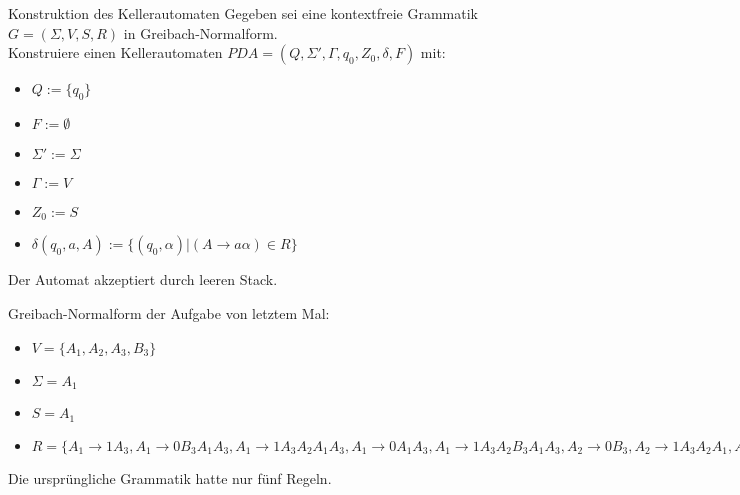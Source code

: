 \begin{frame}
 \begin{block}{Konstruktion des Kellerautomaten}
 Gegeben sei eine kontextfreie Grammatik \(G = (\Sigma, V, S, R)\) in Greibach-Normalform.\\
 Konstruiere einen Kellerautomaten \(PDA = (Q, \Sigma', \Gamma, q_0, Z_0, \delta, F)\) mit:
 \begin{itemize}
  \item $Q := \{q_0\}$
  \item $F := \emptyset$
  \item $\Sigma' := \Sigma$
  \item $\Gamma := V$
  \item $Z_0 := S$
  \item $\delta(q_0, a, A) :=  \{(q_0,\alpha) | (A \rightarrow a \alpha) \in R \}$
 \end{itemize}
 \end{block}
 \pause
 Der Automat akzeptiert durch leeren Stack.
\end{frame}

\begin{frame}
Greibach-Normalform der Aufgabe von letztem Mal:
\begin{itemize}
 \item $V=\{A_1, A_2, A_3, B_3\}$
 \item $\Sigma = A_1$
 \item $S = A_1$
 \item $R = \{A_1 \rightarrow 1A_3, A_1 \rightarrow 0B_3A_1A_3, A_1 \rightarrow 1A_3A_2A_1A_3, A_1 \rightarrow 0A_1A_3, A_1 \rightarrow 1A_3A_2B_3A_1A_3,
 A_2 \rightarrow 0B_3, A_2 \rightarrow 1A_3A_2A_1, A_2 \rightarrow 0A_1, A_2 \rightarrow 1A_3A_2B_3A_1, A_2 \rightarrow 1,
 A_3 \rightarrow 0B_3, A_3 \rightarrow 1A_3A_2B_3, A_3 \rightarrow 1A_3A_2, A_3 \rightarrow 0,
 B_3 \rightarrow 1A_3A_2A_2, B_3 \rightarrow 0B_3A_1A_3A_3A_2, B_3 \rightarrow 1A_3A_2A_1A_3A_3A_2, B_3 \rightarrow 0A_1A_3A_3A_2,
 B_3 \rightarrow 1A_3A_2B_3A_1A_3A_3A_2, B_3 \rightarrow 1A_3A_3A_2B_3, B_3 \rightarrow 0B_3A_1A_3A_3A_2B_3, B_3 \rightarrow 1A_3A_2A_1A_3A_3A_2B_3
 B_3 \rightarrow 0A_1A_3A_3A_2B_3, B_3 \rightarrow 1A_3A_2B_3A_1A_3A_3A_2B_3
 \}$
\end{itemize}
\pause
Die ursprüngliche Grammatik hatte nur fünf Regeln.
\end{frame}

